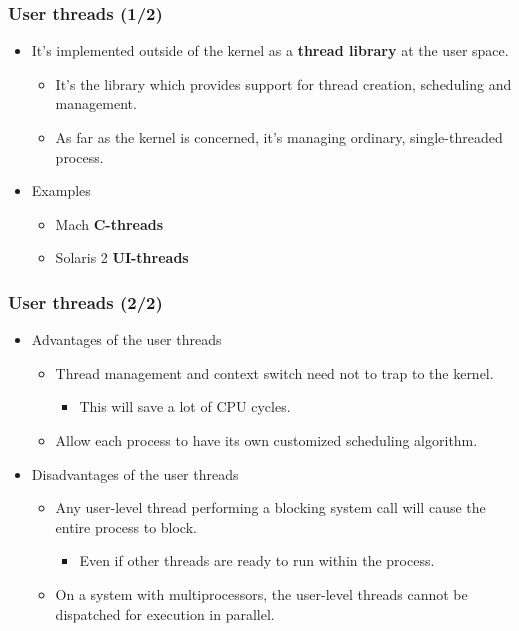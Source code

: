 \documentclass[CJKutf8,xcolor=pdftex,dvipsnames,table]{beamer}
\begin{document}
\begin{CJK*}{UTF8}{song}
  \begin{frame}
  \frametitle{User threads (1/2)} \pause
  \begin{itemize}
  \item{It's implemented outside of the kernel as a \textbf{thread library} at the user space.} \pause
    \begin{itemize}
    \item{It's the library which provides support for thread creation, scheduling and management.} \pause
    \item{As far as the kernel is concerned, it's managing ordinary, single-threaded process.} \pause
    \end{itemize}
  \item{Examples} \pause
    \begin{itemize}
    \item{Mach \textbf{C-threads}} \pause
    \item{Solaris 2 \textbf{UI-threads}}
    \end{itemize}
  \end{itemize}
  \end{frame}

  \begin{frame}
  \frametitle{User threads (2/2)} \pause
  \begin{itemize}
  \item{Advantages of the user threads} \pause
    \begin{itemize}
    \item{Thread management and context switch need not to trap to the kernel.} \pause
      \begin{itemize}
      \item{This will save a lot of CPU cycles.} \pause
      \end{itemize}
    \item{Allow each process to have its own customized scheduling algorithm.} \pause
    \end{itemize}
  \item{Disadvantages of the user threads} \pause
    \begin{itemize}
    \item{Any user-level thread performing a blocking system call will cause the entire process to block.} \pause
      \begin{itemize}
      \item{Even if other threads are ready to run within the process.} \pause
      \end{itemize}
    \item{On a system with multiprocessors, the user-level threads cannot be dispatched for execution in parallel.}
    \end{itemize}
  \end{itemize}
  \end{frame}


\end{CJK*}
\end{document}
